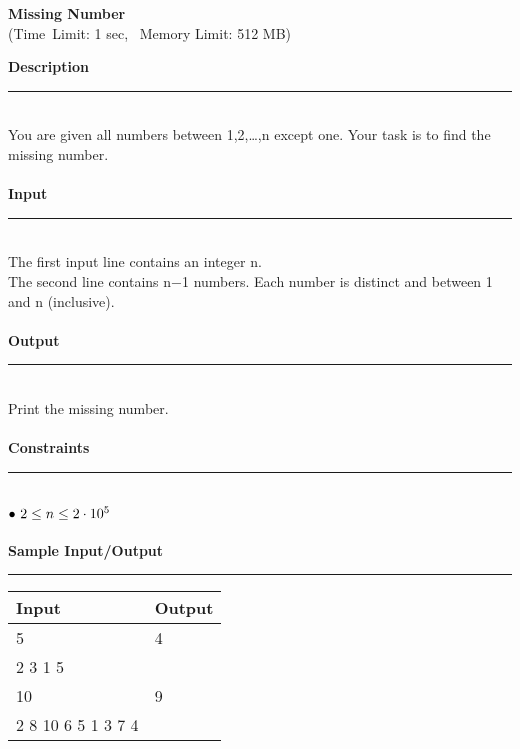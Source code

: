 \documentclass{article}
\begin{document}
    \begin{center} 
        {\LARGE \textbf{Missing Number}}
        \\ {\large (Time\  Limit: 1 sec, \ Memory Limit: 512 MB)}
    \end{center}
    {\Large \textbf {Description}}
    \\\rule[5pt]{18cm}{0.01em}
    \fontsize{12pt}{11pt} \selectfont
    \\You are given all numbers between 1,2,…,n except one. Your task is to find the missing number.
   \\\\ {\Large \textbf{Input}} %
    \\ \rule[5pt]{18cm}{0.02em} 
    \\The first input line contains an integer n.
    \\The second line contains n−1 numbers. Each number is distinct and between 1 and n (inclusive).
    \\\\{ \Large \textbf{Output}} %
    \\\rule[5pt]{18cm}{0.01em} 
    \\Print the missing number.
    \\\\{ \Large \textbf{Constraints}}
    \\\rule[5pt]{18cm}{0.01em} 
    \\ $ \bullet \  {\Large 2  \leq  n \leq 2 \cdot  10^5  }$
    \\\\{\Large \textbf{Sample  Input/Output}}
    \\\rule[5pt]{18cm}{0.01em}
    \begin{table}[h] \Large
        \centering  
        \begin{tabular}{| p{8cm} | p{8cm} |}%
        \hline 
        \fontsize{18pt}{1pt}
        \Large Input&\Large Output
        \\ \hline  
        5&4\\
        2 3 1 5& \\ 
        \hline 
        10 & 9 \\
        2 8 10 6 5 1 3 7 4 & \\
        \hline
        \end{tabular}
    \end{table}
\end{document}
